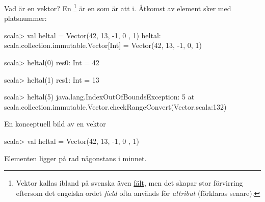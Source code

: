 \begin{Slide}{Vad är en vektor?}\SlideFontSmall
En \footnote{Vektor kallas ibland på svenska även \href{https://sv.wikipedia.org/wiki/F\%C3\%A4lt_\%28datastruktur\%29}{fält}, men det skapar stor förvirring eftersom det engelska ordet \emph{field} ofta används för \emph{attribut} (förklaras senare).} 
 är en  som är  att  i. 
Åtkomst av element sker med platsnummer: 

\begin{REPL}
scala> val heltal = Vector(42, 13, -1, 0 , 1)
heltal: scala.collection.immutable.Vector[Int] = Vector(42, 13, -1, 0, 1)

scala> heltal(0)
res0: Int = 42

scala> heltal(1)
res1: Int = 13

scala> heltal(5)
java.lang.IndexOutOfBoundsException: 5
  at scala.collection.immutable.Vector.checkRangeConvert(Vector.scala:132)
\end{REPL}
\end{Slide}

\begin{Slide}{En konceptuell bild av en vektor}

\begin{REPLnonum}
scala> val heltal = Vector(42, 13, -1, 0 , 1)
\end{REPLnonum}


\vspace{1em} Elementen ligger på rad någonstans i minnet.
\end{Slide}



